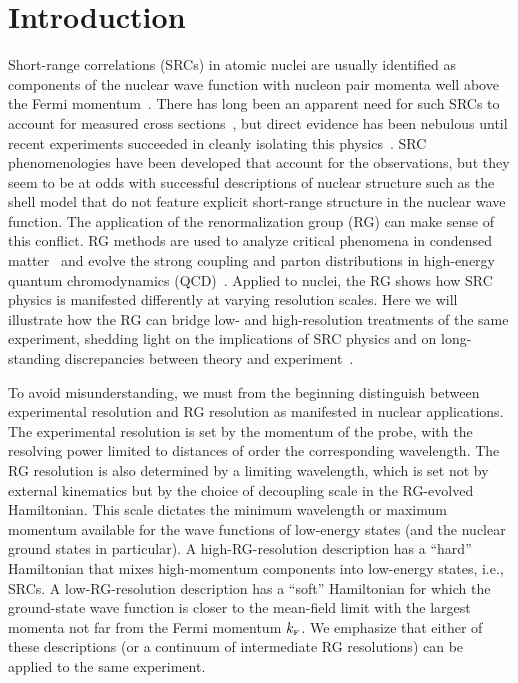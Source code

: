 \documentclass[10pt,aps,prc,floatfix,twocolumn,nofootinbib]{revtex4-1}
\begin{document}
\section{Introduction} \label{sec:introduction}

Short-range correlations (SRCs) in atomic nuclei are usually identified as components of the nuclear wave function with nucleon pair momenta well above the Fermi momentum~\cite{Hen:2016kwk}. 
There has long been an apparent need for such SRCs to account for measured cross sections~\cite{Brueckner:1955zzd}, but direct evidence has been nebulous until recent experiments succeeded in cleanly isolating this physics~\cite{Hen:2016kwk,Korover:2014dma,Hen:2014nza,Duer:2018sby,Duer:2018sxh,Schmookler:2019nvf,Cruz-Torres:2020uke,Schmidt:2020kcl,CLAS:2020rue}. 
SRC phenomenologies have been developed that account for the observations, but they seem to be at odds with successful descriptions of nuclear structure such as the shell model that do not feature explicit short-range structure in the nuclear wave function. 
The application of the renormalization group (RG) can make sense of this conflict. 
RG methods are used to analyze critical phenomena in condensed matter~\cite{Amit:2005} and evolve the strong coupling and parton distributions in high-energy quantum chromodynamics (QCD)~\cite{RevModPhys.67.157,peskin1995introduction}.
Applied to nuclei, the RG shows how SRC physics is manifested differently at varying resolution scales. 
Here we will illustrate how the RG can bridge low- and high-resolution treatments of the same experiment, shedding light on the implications of SRC physics and on long-standing discrepancies between theory and experiment~\cite{Aumann:2020tcq}.

To avoid misunderstanding, we must from the beginning distinguish between experimental resolution and RG resolution as manifested in nuclear applications.
The experimental resolution is set by the momentum of the probe, with the resolving power limited to distances of order the corresponding wavelength.
The RG resolution is also determined by a limiting wavelength, which is set not by external kinematics but by the choice of decoupling scale in the RG-evolved Hamiltonian.
This scale dictates the minimum wavelength or maximum momentum available for the wave functions of low-energy states (and the nuclear ground states in particular).
A high-RG-resolution description has a ``hard'' Hamiltonian that mixes high-momentum components into low-energy states, i.e., SRCs. 
A low-RG-resolution description has a ``soft'' Hamiltonian for which the ground-state wave function is closer to the mean-field limit with the largest momenta not far from the Fermi momentum $k_{\scriptscriptstyle{\text F}}$.
We emphasize that either of these descriptions (or a continuum of intermediate RG resolutions) can be applied to the same experiment.
\end{document}
